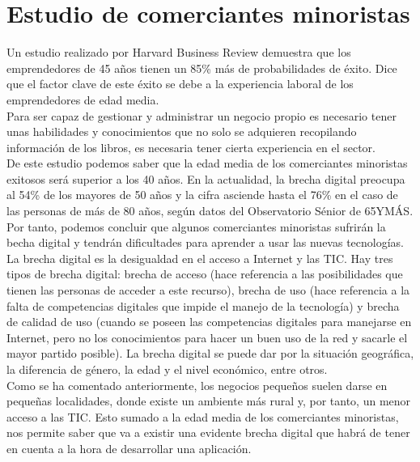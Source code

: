 \newpage

\section{Estudio de comerciantes minoristas}

Un estudio realizado por Harvard Business Review demuestra que los emprendedores de 45 años tienen un 85\% más de probabilidades de éxito. Dice que el factor clave de este éxito se debe a la experiencia laboral de los emprendedores de edad media. \\

Para ser capaz de gestionar y administrar un negocio propio es necesario tener unas habilidades y conocimientos que no solo se adquieren recopilando información de los libros, es necesaria tener cierta experiencia en el sector. \cite{autonomos2024master} \\

De este estudio podemos saber que la edad media de los comerciantes minoristas exitosos será superior a los 40 años. En la actualidad, la brecha digital preocupa al 54\% de los mayores de 50 años y la cifra asciende hasta el 76\% en el caso de las personas de más de 80 años, según datos del Observatorio Sénior de 65YMÁS. Por tanto, podemos concluir que algunos comerciantes minoristas sufrirán la becha digital y tendrán dificultades para aprender a usar las nuevas tecnologías. \cite{bbva2024brechadigital} \\

La brecha digital es la desigualdad en el acceso a Internet y las TIC. Hay tres tipos de brecha digital: brecha de acceso (hace referencia a las posibilidades que tienen las personas de acceder a este recurso), brecha de uso (hace referencia a la falta de competencias digitales que impide el manejo de la tecnología) y brecha de calidad de uso (cuando se poseen las competencias digitales para manejarse en Internet, pero no los conocimientos para hacer un buen uso de la red y sacarle el mayor partido posible). La brecha digital se puede dar por la situación geográfica, la diferencia de género, la edad y el nivel económico, entre otros. \cite{iberdrolaBrechaDigital} \\

Como se ha comentado anteriormente, los negocios pequeños suelen darse en pequeñas localidades, donde existe un ambiente más rural y, por tanto, un menor acceso a las TIC. Esto sumado a la edad media de los comerciantes minoristas, nos permite saber que va a existir una evidente brecha digital que habrá de tener en cuenta a la hora de desarrollar una aplicación. 

